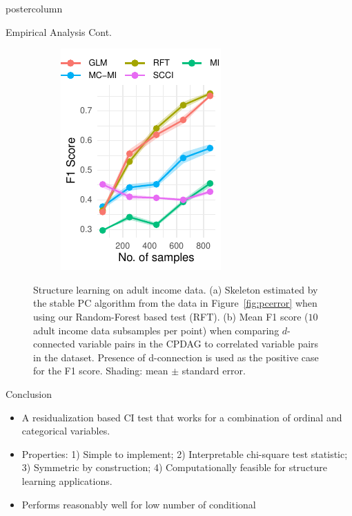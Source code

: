 \documentclass{beamer}
\begin{document}
\begin{frame}
\begin{columns}
\begin{column}{0.33\textwidth}
\begin{beamercolorbox}[center]{postercolumn}
\begin{minipage}{.98\textwidth}
{\begin{myblock}{Empirical Analysis Cont.}
\begin{figure}
\begin{subfigure}[b]{0.6\columnwidth}
								\caption{}
								\label{fig:sl_adult_model}
							\end{subfigure}%
							\begin{subfigure}[b]{0.4\columnwidth}
								\includegraphics[scale=2.7]{../in_person/imgs/adult_F1.pdf}
								\caption{}
								\label{fig:sl_adult}
							\end{subfigure}
							\caption{Structure learning on adult income data. (a) Skeleton
								estimated by the stable PC algorithm from the data in
								Figure~\ref{fig:pcerror} when using our Random-Forest based
								test (RFT). (b) Mean F1 score ($10$ adult income data subsamples
								per point)
								when comparing $d$-connected variable pairs in the CPDAG to
								correlated variable pairs in the dataset. Presence of
								d-connection is used as the positive case for the
								F1 score. Shading: mean $\pm$ standard
								error.}
						\end{figure}
					\end{myblock}\vfill
					\begin{myblock}{Conclusion}
						\begin{itemize}
							\item A residualization based CI test that works for a
								combination of ordinal and categorical variables.
							\item Properties: 1) Simple to implement; 2) Interpretable
								chi-square test statistic; 3) Symmetric by
								construction; 4) Computationally feasible for structure learning applications.
							\item Performs reasonably well for low number of conditional

\end{itemize}
\end{myblock}}
\end{minipage}
\end{beamercolorbox}
\end{column}
\end{columns}
\end{frame}
\end{document}
